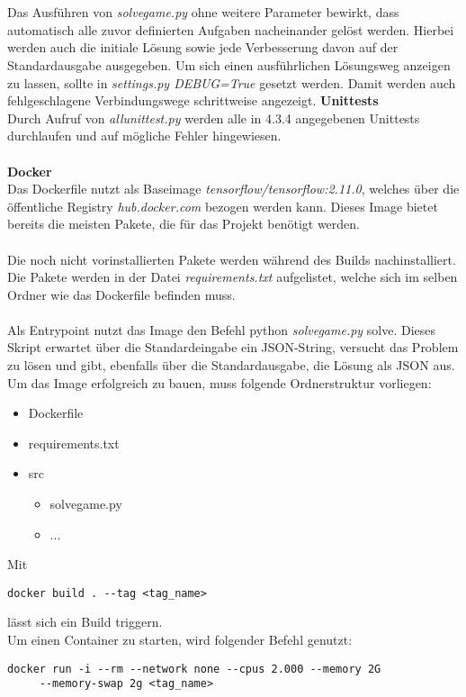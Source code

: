 \\\\
Das Ausführen von \textit{solve\textunderscore{}game.py} ohne weitere Parameter bewirkt, dass automatisch alle zuvor definierten Aufgaben nacheinander gelöst werden. Hierbei werden auch die initiale Lösung sowie jede Verbesserung davon auf der Standardausgabe ausgegeben. Um sich einen ausführlichen Lösungsweg anzeigen zu lassen, sollte in \textit{settings.py DEBUG=True} gesetzt werden. Damit werden auch fehlgeschlagene Verbindungswege schrittweise angezeigt.
\newpage
\textbf{Unittests}\\
Durch Aufruf von \textit{all\textunderscore{}unit\textunderscore{}test.py} werden alle in 4.3.4 angegebenen Unittests durchlaufen und auf mögliche Fehler hingewiesen.
\\\\
\textbf{Docker}\\
Das Dockerfile nutzt als Baseimage \textit{tensorflow/tensorflow:2.11.0}, welches über die öffentliche Registry \textit{hub.docker.com} bezogen werden kann. Dieses Image bietet bereits die meisten Pakete, die für das Projekt benötigt werden.
\\\\
Die noch nicht vorinstallierten Pakete werden während des Builds nachinstalliert. Die Pakete werden in der Datei \textit{requirements.txt} aufgelistet, welche sich im selben Ordner wie das Dockerfile befinden muss.
\\\\
Als Entrypoint nutzt das Image den Befehl python \textit{solve\textunderscore{}game.py} solve. Dieses Skript erwartet über die Standardeingabe ein JSON-String, versucht das Problem zu lösen und gibt, ebenfalls über die Standardausgabe, die Lösung als JSON aus.
\\
Um das Image erfolgreich zu bauen, muss folgende Ordnerstruktur vorliegen:
\begin{itemize}
	\item Dockerfile
	\item requirements.txt
	\item src
	\begin{itemize}
		\item solve\textunderscore{}game.py
		\item ...
	\end{itemize}
\end{itemize}

Mit 
\begin{verbatim}docker build . --tag <tag_name>\end{verbatim}
lässt sich ein Build triggern. 
\\
Um einen Container zu starten, wird folgender Befehl genutzt:
\begin{verbatim}docker run -i --rm --network none --cpus 2.000 --memory 2G
	 --memory-swap 2g <tag_name>\end{verbatim}

